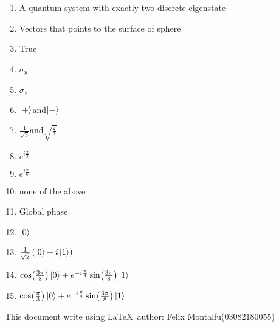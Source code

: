 \documentclass[a4paper]{article}
\begin{document}
    \begin{enumerate}[1.]
        \item A quantum system with exactly two discrete eigenstate
        \item Vectors that points to the surface of sphere
        \item True
        \item $\sigma_y$
        \item $\sigma_z$
        \item $\ket{+}$and$\ket{-}$
        \item $\frac{1}{\sqrt{3}}$and$\sqrt{\frac{2}{3}}$
        \item $e^{i\frac{\pi}{3}}$
        \item $e^{i\frac{\pi}{6}}$
        \item none of the above
        \item Global phase
        \item $\ket{0}$
        \item $\frac{1}{\sqrt{2}}\left( \ket{0} + i\ket{1} \right)$
        \item $\cos(\frac{3\pi}{8})\ket{0}+e^{-i\frac{\pi}{4}}\sin(\frac{3\pi}{8})\ket{1}$
        \item $\cos(\frac{\pi}{3})\ket{0}+e^{-i\frac{\pi}{4}}\sin(\frac{3\pi}{8})\ket{1}$
    \end{enumerate}
    This document write using \LaTeX \ author: Felix Montalfu(03082180055)
\end{document}
